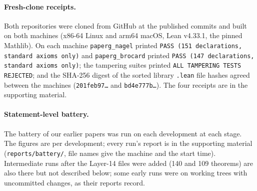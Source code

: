 \documentclass[11pt]{article}
\theoremstyle{definition}
\theoremstyle{remark}
\newcommand{\lean}[1]{\texttt{#1}}
\begin{document}
\paragraph{Fresh-clone receipts.} Both repositories were cloned from GitHub at the published commits
and built on both machines (x86-64 Linux and arm64 macOS, Lean v4.33.1, the pinned Mathlib). On each
machine \lean{paperg\_nagel} printed \lean{PASS (151 declarations, standard axioms only)} and
\lean{paperg\_brocard} printed \lean{PASS (147 declarations, standard axioms only)}; the tampering
suites printed \lean{ALL TAMPERING TESTS REJECTED}; and the SHA-256 digest of the sorted library
\lean{.lean} file hashes agreed between the machines (\texttt{201feb97\ldots} and
\texttt{bd4e777b\ldots}). The four receipts are in the supporting material.

\paragraph{Statement-level battery.} The battery of our earlier papers was run on each development
at each stage. The figures are per development; every run's report is in the supporting material
(\lean{reports/battery/}, file names give the machine and the start time). Intermediate runs after
the Layer-14 files were added (140 and 109 theorems) are also there but not described below; some
early runs were on working trees with uncommitted changes, as their reports record.
\end{document}
